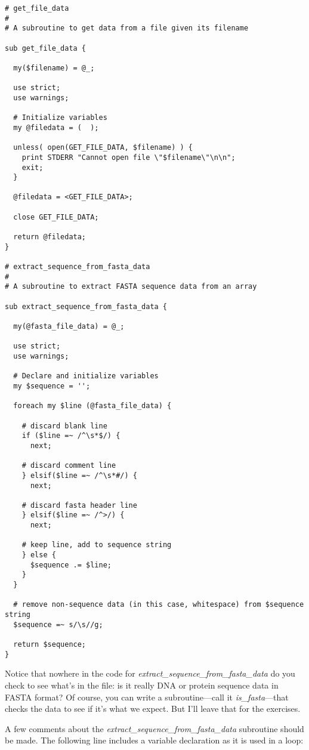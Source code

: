 \begin{lstlisting}
# get_file_data
#
# A subroutine to get data from a file given its filename

sub get_file_data {

  my($filename) = @_;

  use strict;
  use warnings;

  # Initialize variables
  my @filedata = (  );

  unless( open(GET_FILE_DATA, $filename) ) {
    print STDERR "Cannot open file \"$filename\"\n\n";
    exit;
  }

  @filedata = <GET_FILE_DATA>;

  close GET_FILE_DATA;

  return @filedata;
}

# extract_sequence_from_fasta_data
#
# A subroutine to extract FASTA sequence data from an array

sub extract_sequence_from_fasta_data {

  my(@fasta_file_data) = @_;

  use strict;
  use warnings;

  # Declare and initialize variables
  my $sequence = '';

  foreach my $line (@fasta_file_data) {

    # discard blank line
    if ($line =~ /^\s*$/) {
      next;

    # discard comment line
    } elsif($line =~ /^\s*#/) {
      next;

    # discard fasta header line
    } elsif($line =~ /^>/) {
      next;

    # keep line, add to sequence string
    } else {
      $sequence .= $line;
    }
  }

  # remove non-sequence data (in this case, whitespace) from $sequence string
  $sequence =~ s/\s//g;

  return $sequence;
}
\end{lstlisting}

Notice that nowhere in the code for \textit{extract\_sequence\_from\_fasta\_data} do you check to see what's in the file: is it really DNA or protein sequence data in FASTA format? Of course, you can write a subroutine—call it \textit{is\_fasta}—that checks the data to see if it's what we expect. But I'll leave that for the exercises. 

A few comments about the \textit{extract\_sequence\_from\_fasta\_data} subroutine should be made. The following line includes a variable declaration as it is used in a loop: 

